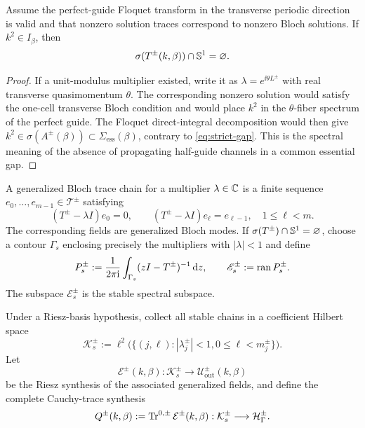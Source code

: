 \begin{lemma}
\label{lem:gap-unit-circle}
Assume the perfect-guide Floquet transform in the transverse periodic direction
is valid and that nonzero solution traces correspond to nonzero Bloch
solutions.  If $k^2\in I_\beta$, then
\begin{equation}
  \sigma(T^\pm(k,\beta))\cap\mathbb{S}^{1}=\varnothing.
  \label{eq:no-unit-multiplier}
\end{equation}
\end{lemma}
\begin{proof}
If a unit-modulus multiplier existed, write it as
$\lambda=e^{\ii\theta L^\pm}$ with real transverse quasimomentum $\theta$.
The corresponding nonzero solution would satisfy the one-cell transverse
Bloch condition and would place $k^2$ in the $\theta$-fiber spectrum of the
perfect guide.  The Floquet direct-integral decomposition would then give
$k^2\in\sigma(A^\pm(\beta))\subset\Sigma_{\mathrm{ess}}(\beta)$, contrary to
\eqref{eq:strict-gap}.  This is the spectral meaning of the absence of
propagating half-guide channels in a common essential gap.
\end{proof}

A generalized Bloch trace chain for a multiplier $\lambda\in\mathbb{C}$ is a finite
sequence $e_0,\ldots,e_{m-1}\in\mathscr T^\pm$ satisfying
\begin{equation}
  (T^\pm-\lambda I)e_0=0,
  \qquad (T^\pm-\lambda I)e_\ell=e_{\ell-1},
  \quad 1\leq\ell<m.
  \label{eq:Jordan-chain}
\end{equation}
The corresponding fields are generalized Bloch modes.  If
$\sigma(T^\pm)\cap\mathbb{S}^{1}=\varnothing$, choose a contour $\Gamma_s$ enclosing
precisely the multipliers with $|\lambda|<1$ and define
\begin{equation}
  P_s^\pm:=\frac{1}{2\pi\mathrm{i}}\int_{\Gamma_s}(zI-T^\pm)^{-1}\,\mathrm{d} z,
  \qquad \mathscr E_s^\pm:=\operatorname{ran} P_s^\pm.
  \label{eq:stable-projection}
\end{equation}
The subspace $\mathscr E_s^\pm$ is the stable spectral subspace.

Under a Riesz-basis hypothesis, collect all stable chains in a coefficient
Hilbert space
\begin{equation}
  \mathcal K_s^\pm:=
  \ell^2\bigl(\{(j,\ell): |\lambda_j^\pm|<1,
  0\leq\ell<m_j^\pm\}\bigr).
  \label{eq:stable-coefficients}
\end{equation}
Let
\begin{equation}
  \mathcal E^\pm(k,\beta):\mathcal K_s^\pm
  \longrightarrow\mathcal U^\pm_{\mathrm{out}}(k,\beta)
  \label{eq:field-synthesis}
\end{equation}
be the Riesz synthesis of the associated generalized fields, and define the
complete Cauchy-trace synthesis
\begin{equation}
  Q^\pm(k,\beta):=\operatorname{Tr}^{0,\pm}\mathcal E^\pm(k,\beta):
  \mathcal K_s^\pm\longrightarrow\mathcal H_\Gamma^\pm.
  \label{eq:trace-synthesis}
\end{equation}

